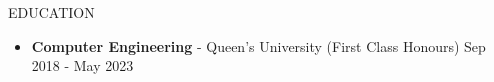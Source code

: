 \documentclass{resume} %
\begin{document}
\begin{rSection}{EDUCATION}
    \begin{itemize}
        \item {\bf Computer Engineering} - Queen's University (First Class Honours) \hfill {Sep 2018 - May 2023}
    \end{itemize}
\end{rSection}
\end{document}
